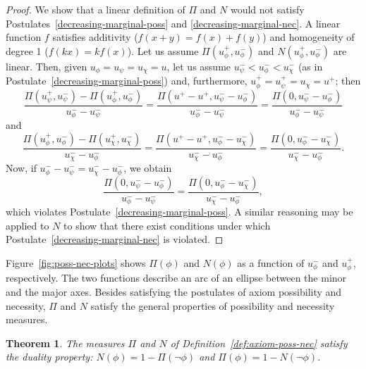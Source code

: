 \documentclass[review]{elsarticle}
\newtheorem{theorem}{Theorem}
\theoremstyle{definition}
\begin{document}
\begin{proof}
  We show that a linear definition of $\Pi$ and $N$ would not satisfy
  Postulates~\ref{decreasing-marginal-poss} and \ref{decreasing-marginal-nec}.
  A linear function $f$ satisfies additivity ($f(x + y) = f(x) + f(y)$) and
  homogeneity of degree 1 ($f(kx) = kf(x)$).
  Let us assume $\Pi(u_\phi^+, u_\phi^-)$ and $N(u_\phi^+, u_\phi^-)$ are linear.
  Then, given $u_\phi = u_\psi = u_\chi = u$, let us assume
  $u_\psi^- < u_\phi^- < u_\chi^-$ (as in Postulate~\ref{decreasing-marginal-poss})
  and, furthermore, $u_\phi^+ = u_\psi^+ = u_\chi = u^+$; then
  \[
    \frac{\Pi(u_\psi^+, u_\psi^-) - \Pi(u_\phi^+, u_\phi^-)}{u_\phi^- - u_\psi^-} = 
    \frac{\Pi(u^+ - u^+, u_\psi^- - u_\phi^-)}{u_\phi^- - u_\psi^-} = 
    \frac{\Pi(0, u_\psi^- - u_\phi^-)}{u_\phi^- - u_\psi^-}
  \]
  and
  \[
    \frac{\Pi(u_\phi^+, u_\phi^-) - \Pi(u_\chi^+, u_\chi^-)}{u_\chi^- - u_\phi^-} =
    \frac{\Pi(u^+ - u^+, u_\phi^- - u_\chi^-)}{u_\chi^- - u_\phi^-} =
    \frac{\Pi(0, u_\phi^- - u_\chi^-)}{u_\chi^- - u_\phi^-}.
  \]
  Now, if $u_\phi^- - u_\psi^- = u_\chi^- - u_\phi^-$, we obtain
  \[
    \frac{\Pi(0, u_\psi^- - u_\phi^-)}{u_\phi^- - u_\psi^-} =
    \frac{\Pi(0, u_\phi^- - u_\chi^-)}{u_\chi^- - u_\phi^-},
  \]
  which violates Postulate~\ref{decreasing-marginal-poss}.
  A similar reasoning may be applied to $N$ to show that there exist conditions
  under which Postulate~\ref{decreasing-marginal-nec} is violated.
\end{proof}

Figure~\ref{fig:poss-nec-plots} shows $\Pi(\phi)$ and $N(\phi)$ as a function of
$u_\phi^-$ and $u_\phi^+$, respectively.
 The two functions describe an arc of an ellipse between the minor and the major axes.
Besides satisfying the postulates of axiom possibility and necessity,
$\Pi$ and $N$ satisfy the general properties of possibility and necessity measures.

\begin{theorem}
  The measures $\Pi$ and $N$ of Definition~\ref{def:axiom-poss-nec} satisfy
  the duality property: $N(\phi) = 1 - \Pi(\neg\phi)$ and
  $\Pi(\phi) = 1 - N(\neg\phi)$.
\end{theorem}
\end{document}
